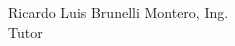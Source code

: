 \begin{center}
	\fontsize{11}{11}\selectfont
	Ricardo Luis Brunelli Montero, Ing.\\
	Tutor
\end{center}